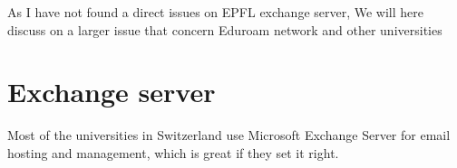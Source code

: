 \documentclass[../main.tex]{subfiles}
\begin{document}
	
	As I have not found a direct issues on EPFL exchange server, We will here discuss on a larger issue that concern Eduroam network and other universities
	
	\section{Exchange server}
	Most of the universities in Switzerland use Microsoft Exchange Server for email hosting and management, which is great if they set it right. 
	
\end{document}

